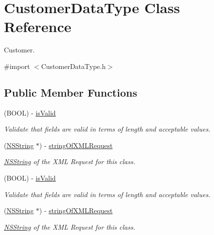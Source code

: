 \hypertarget{interface_customer_data_type}{
\section{CustomerDataType Class Reference}
\label{interface_customer_data_type}
}


Customer.  




{\ttfamily \#import $<$CustomerDataType.h$>$}

\subsection*{Public Member Functions}
\begin{DoxyCompactItemize}
\item 
(BOOL) -\/ \hyperlink{interface_customer_data_type_a2796d0e14f1ad163dc81960731914b4b}{isValid}
\begin{DoxyCompactList}\small\item\em Validate that fields are valid in terms of length and acceptable values. \item\end{DoxyCompactList}\item 
(\hyperlink{class_n_s_string}{NSString} $\ast$) -\/ \hyperlink{interface_customer_data_type_a0997a17232cee2090415b705faae5e3b}{stringOfXMLRequest}
\begin{DoxyCompactList}\small\item\em \hyperlink{class_n_s_string}{NSString} of the XML Request for this class. \item\end{DoxyCompactList}\item 
(BOOL) -\/ \hyperlink{interface_customer_data_type_a2796d0e14f1ad163dc81960731914b4b}{isValid}
\begin{DoxyCompactList}\small\item\em Validate that fields are valid in terms of length and acceptable values. \item\end{DoxyCompactList}\item 
(\hyperlink{class_n_s_string}{NSString} $\ast$) -\/ \hyperlink{interface_customer_data_type_a0997a17232cee2090415b705faae5e3b}{stringOfXMLRequest}
\begin{DoxyCompactList}\small\item\em \hyperlink{class_n_s_string}{NSString} of the XML Request for this class. \item\end{DoxyCompactList}\item 

\end{DoxyCompactItemize}
